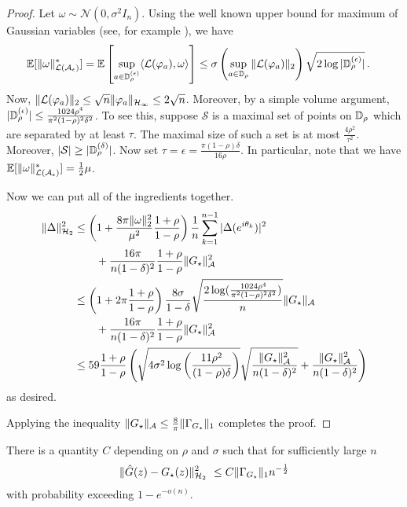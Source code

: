 \begin{proof}
Let $\omega \sim \mathcal{N}(0,\sigma^2 I_n)$. Using the well known upper bound for maximum of Gaussian variables (see, for example \cite{lr76}), we have
\begin{align*}
\operatorname{\mathbb{E}}[\|\omega\|_{\mathcal{L}(\mathcal{A}_\epsilon)}^*] &=	\operatorname{\mathbb{E}}\left[ \sup_{a\in\mathbb{D}_\rho^{(\epsilon)}} \langle \mathcal{L}(\varphi_a), \omega \rangle\right] \leq \sigma \left(\sup_{a\in \mathbb{D}_\rho}\|\mathcal{L}(\varphi_a)\|_2\right) \sqrt{2 \log |\mathbb{D}_\rho^{(\epsilon)}|}\,.
\end{align*}
Now, $\|\mathcal{L}(\varphi_a)\|_2 \leq \sqrt{n} \|\varphi_a\|_{\mathcal{H}_\infty}\leq 2 \sqrt{n}$.  Moreover, by a simple volume argument, $|\mathbb{D}_\rho^{(\epsilon)}| \leq \frac{1024 \rho^4}{\pi^2(1-\rho)^2\delta^2}$.  To see this, suppose $\mathcal{S}$ is a maximal set of points on $\mathbb{D}_\rho$ which are separated by at least $\tau$.  The maximal size of such a set is at most  $\frac{4\rho^2}{\tau^2}$. Moreover, $|\mathcal{S}|\geq |\mathbb{D}_\rho^{(\delta)}|$.  Now set $\tau = \epsilon=\tfrac{\pi (1-\rho) \delta}{16\rho}$.  In particular, note that we have $\operatorname{\mathbb{E}}[\|\omega\|^*_{\mathcal{L}(\mathcal{A}_\epsilon)}] =\tfrac{1}{2} \mu$.

Now we can put all of the ingredients together.
\begin{align*}
\|\Delta\|_{\mathcal{H}_2}^2  &\leq \left(1+\frac{8\pi \|\omega\|_2^2}{\mu^2}\frac{1+\rho}{1-\rho} \right)\frac{1}{n}\sum_{k=1}^{n-1} |\Delta(e^{i\theta_k})|^2\\
&\qquad + \frac{16\pi}{n(1-\delta)^2} \frac{1+\rho}{1-\rho}  \|G_\star\|_{\mathcal{A}}^2\\
&  \leq \left(1+2\pi \frac{1+\rho}{1-\rho} \right) \frac{8\sigma}{1-\delta} \sqrt{\frac{2\log(\frac{1024 \rho^4}{\pi^2(1-\rho)^2\delta^2})}{n}}\|G_\star\|_{\mathcal{A}} \\
&\qquad+ \frac{16\pi}{n(1-\delta)^2} \frac{1+\rho}{1-\rho}  \|G_\star\|_{\mathcal{A}}^2\\
&  \leq  59 \frac{1+\rho}{1-\rho} \left( \sqrt{4\sigma^2 \log\left(\frac{11 \rho^2}{(1-\rho)\delta}\right)}\sqrt{\frac{\|G_\star\|_{\mathcal{A}}^2}{n(1-\delta)^2} } + \frac{\|G_\star\|_{\mathcal{A}}^2}{n(1-\delta)^2}   \right)
\end{align*}
as desired.

Applying the inequality $\|G_\star\|_{\mathcal{A}}\leq \tfrac{8}{\pi}\|\Gamma_{G_\star}\|_1$ completes the proof.	
\end{proof}
\begin{corollary} \label{cor:1}
There is a quantity $C$ depending on $\rho$ and $\sigma$ such that for sufficiently large $n$
$$\|\hat{G}(z)-G_{\star}(z)\|_{\mathcal{H}_2}^2\ \leq C \| \Gamma_{G_{\star}} \|_1 n^{-\frac{1}{2}}$$
with probability exceeding $1-e^{-o(n)}$.
\end{corollary}
